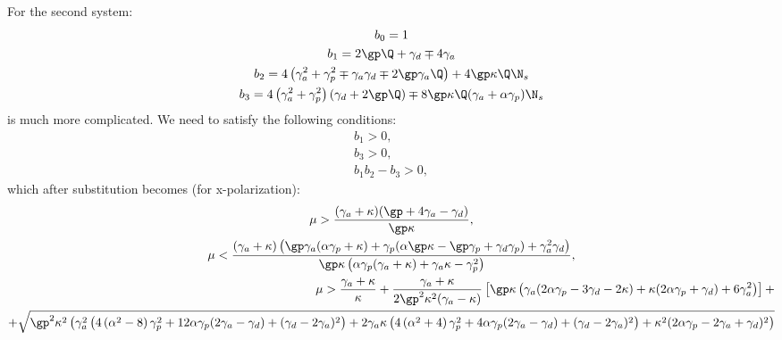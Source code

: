 \documentclass[12pt, notitlepage]{report}
\begin{document}
For the second system:
\begin{gather}
	b_0 = 1\\
	b_1 = 2\gp\Q +\gamma_d \mp 4\gamma_a \\
	b_2 = 4 \left(\gamma_a^2 + \gamma_p^2 \mp \gamma_a\gamma_d \mp 2 \gp\gamma_a\Q\right)  + 4\gp\kappa\Q \N_s\\
	b_3 = 4 \left(\gamma_a^2+\gamma_p^2\right) (\gamma_d + 2 \gp\Q) \mp 8 \gp\kappa\Q (\gamma_a + \alpha  \gamma_p)\N_s
\end{gather}
is much more complicated. We need to satisfy the following conditions:
\begin{gather}
	b_1 > 0,\\
	b_3 > 0,\\
	b_1b_2 - b_3 > 0,
\end{gather}
which after substitution becomes (for x-polarization):
\begin{gather}
	\mu > \frac{(\gamma_a+\kappa ) (\gp +4 \gamma_a - \gamma_d)}{\gp  \kappa },\\
	\mu < \frac{(\gamma_a+\kappa ) \left(\gp  \gamma_a (\alpha  \gamma_p+\kappa )+\gamma_p (\alpha  \gp  \kappa -\gp  \gamma_p+\gamma_d \gamma_p)+\gamma_a^2 \gamma_d\right)}{\gp  \kappa  \left(\alpha  \gamma_p (\gamma_a+\kappa )+\gamma_a \kappa -\gamma_p^2\right)},\\
	\begin{aligned}
	\mu > \frac{\gamma_a+\kappa }{\kappa } + \frac{\gamma_a+\kappa }{2 \gp ^2 \kappa ^2 (\gamma_a-\kappa )}\left[
	\gp  \kappa  \left(\gamma_a (2 \alpha  \gamma_p-3 \gamma_d-2 \kappa )+\kappa  (2 \alpha  \gamma_p+\gamma_d)+6 \gamma_a^2\right)
	\right] + \\
	+ \sqrt{\gp ^2 \kappa ^2 \left(\gamma_a^2 \left(4 \left(\alpha ^2-8\right) \gamma_p^2+12 \alpha  \gamma_p (2 \gamma_a-\gamma_d)+(\gamma_d-2 \gamma_a)^2\right)+2 \gamma_a \kappa  \left(4 \left(\alpha ^2+4\right) \gamma_p^2+4 \alpha  \gamma_p (2 \gamma_a-\gamma_d)+(\gamma_d-2 \gamma_a)^2\right)+\kappa ^2 (2 \alpha  \gamma_p-2 \gamma_a+\gamma_d)^2\right)}
	\end{aligned}
\end{gather}
\end{document}
